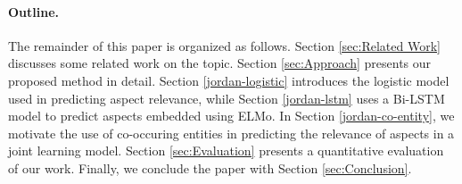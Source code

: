 \paragraph{\textbf{Outline.}} The remainder of this paper is organized as follows. Section \ref{sec:Related Work} discusses some related work on the topic. %
Section \ref{sec:Approach} presents our proposed method in detail. Section \ref{jordan-logistic} introduces the logistic model used in predicting aspect relevance, while Section \ref{jordan-lstm} uses a Bi-LSTM model to predict aspects embedded using ELMo. In Section \ref{jordan-co-entity}, we motivate the use of co-occuring entities in predicting the relevance of aspects in a joint learning model.  Section \ref{sec:Evaluation} presents a quantitative evaluation of our work. Finally, we conclude the paper with Section \ref{sec:Conclusion}.

